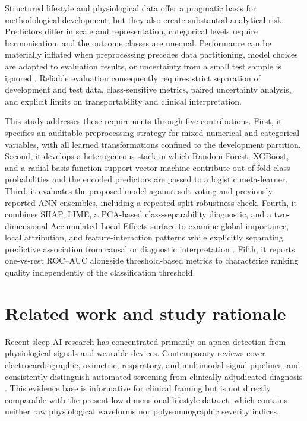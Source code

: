 \documentclass{elektr}
\begin{document}
Structured lifestyle and physiological data offer a pragmatic basis for methodological development, but they also create substantial analytical risk. Predictors differ in scale and representation, categorical levels require harmonisation, and the outcome classes are unequal. Performance can be materially inflated when preprocessing precedes data partitioning, model choices are adapted to evaluation results, or uncertainty from a small test sample is ignored \cite{kapoor2023,efthimiou2024,collins2024}. Reliable evaluation consequently requires strict separation of development and test data, class-sensitive metrics, paired uncertainty analysis, and explicit limits on transportability and clinical interpretation.

This study addresses these requirements through five contributions. First, it specifies an auditable preprocessing strategy for mixed numerical and categorical variables, with all learned transformations confined to the development partition. Second, it develops a heterogeneous stack in which Random Forest, XGBoost, and a radial-basis-function support vector machine contribute out-of-fold class probabilities and the encoded predictors are passed to a logistic meta-learner. Third, it evaluates the proposed model against soft voting and previously reported ANN ensembles, including a repeated-split robustness check. Fourth, it combines SHAP, LIME, a PCA-based class-separability diagnostic, and a two-dimensional Accumulated Local Effects surface to examine global importance, local attribution, and feature-interaction patterns while explicitly separating predictive association from causal or diagnostic interpretation \cite{jung2023,allen2024,pesapane2026}. Fifth, it reports one-vs-rest ROC--AUC alongside threshold-based metrics to characterise ranking quality independently of the classification threshold.

\section{Related work and study rationale}
Recent sleep-AI research has concentrated primarily on apnea detection from physiological signals and wearable devices. Contemporary reviews cover electrocardiographic, oximetric, respiratory, and multimodal signal pipelines, and consistently distinguish automated screening from clinically adjudicated diagnosis \cite{bazoukis2023,tyagi2023,abdalrazaq2024,giorgi2025}. This evidence base is informative for clinical framing but is not directly comparable with the present low-dimensional lifestyle dataset, which contains neither raw physiological waveforms nor polysomnographic severity indices.
\end{document}
